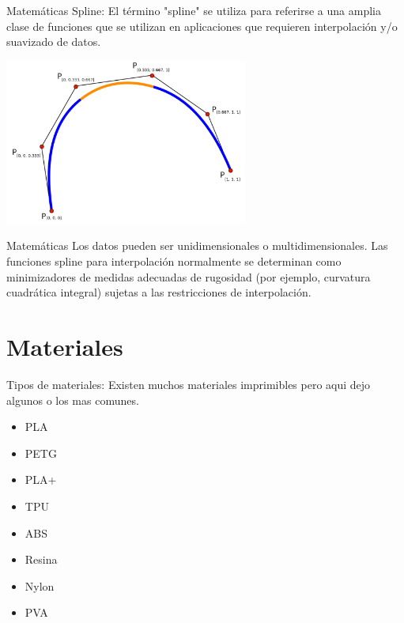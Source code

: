 \documentclass{beamer}
\begin{document}
\begin{frame}{Matem\'aticas}
Spline: El t\'ermino "spline" se utiliza para referirse a una amplia clase de funciones que se utilizan en aplicaciones que requieren interpolaci\'on y/o suavizado de datos. 
\begin{center}
\includegraphics[width=8cm]{1280px-Parametic_Cubic_Spline.svg.png}
\end{center}
    
\end{frame}
\begin{frame}{Matem\'aticas}
    Los datos pueden ser unidimensionales o multidimensionales. Las funciones spline para interpolaci\'on normalmente se determinan como minimizadores de medidas adecuadas de rugosidad (por ejemplo, curvatura cuadr\'atica integral) sujetas a las restricciones de interpolaci\'on.
\end{frame}









\section{Materiales}
\begin{frame}{Tipos de materiales:}
Existen muchos materiales imprimibles pero aqui dejo algunos o los mas comunes.
\begin{itemize}
    \item PLA
    \item PETG
    \item PLA+
    \item TPU
    \item ABS
    \item Resina
    \item Nylon
    \item PVA
\end{itemize}
    
\end{frame}
\end{document}
